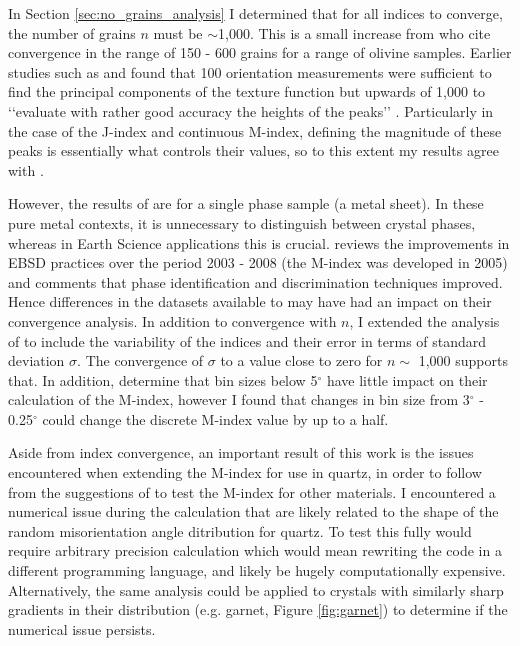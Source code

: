 \documentclass[a4paper,12pt,twoside]{report}
\numberwithin{equation}{chapter}
\begin{document}
In Section \ref{sec:no_grains_analysis} I determined that for all indices to converge, the number of grains $n$ must be $\sim$1,000. This is a small increase from \cite{Skemer} who cite convergence in the range of 150 - 600 grains for a range of olivine samples. Earlier studies such as \cite{Wright1990} and \cite{Baudin1993} found that 100 orientation measurements were sufficient to find the principal components of the texture function but upwards of 1,000 to \lq\lq{}evaluate with rather good accuracy the heights of the peaks\rq\rq{} \citep{Baudin1993}. Particularly in the case of the J-index and continuous M-index, defining the magnitude of these peaks is essentially what controls their values, so to this extent my results agree with \cite{Baudin1993}. 

However, the results of \cite{Baudin1993} are for a single phase sample (a metal sheet). In these pure metal contexts, it is unnecessary to distinguish between crystal phases, whereas in Earth Science applications this is crucial. \cite{Randle2009} reviews the improvements in EBSD practices over the period 2003 - 2008 (the M-index was developed in 2005) and comments that phase identification and discrimination techniques improved. Hence differences in the datasets available to \cite{Skemer} may have had an impact on their convergence analysis. In addition to convergence with $n$, I extended the analysis of \cite{Skemer} to include the variability of the indices and their error in terms of standard deviation $\sigma$. The convergence of $\sigma$ to a value close to zero for     
$n \sim$ 1,000 supports that. In addition, \cite{Skemer} determine that bin sizes below 5$^\circ$ have little impact on their calculation of the M-index, however I found that changes in bin size from 3$^\circ$ - 0.25$^\circ$ could change the discrete M-index value by up to a half. 

Aside from index convergence, an important result of this work is the issues encountered when extending the M-index for use in quartz, in order to follow from the suggestions of \cite{Skemer} to test the M-index for other materials. I encountered a numerical issue during the calculation that are likely related to the shape of the random misorientation angle ditribution for quartz. To test this fully would require arbitrary precision calculation which would mean rewriting the code in a different programming language, and likely be hugely computationally expensive. Alternatively, the same analysis could be applied to crystals with similarly sharp gradients in their distribution (e.g. garnet, Figure \ref{fig:garnet}) to determine if the numerical issue persists.
\end{document}
